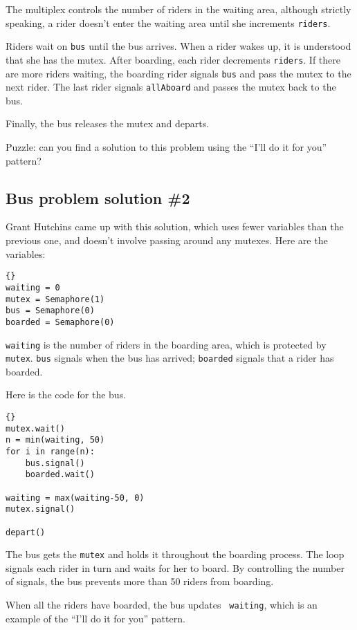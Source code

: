 \documentclass{book}
\newcommand{\clearemptydoublepage}{\newpage\cleardoublepage}
\begin{document}
The multiplex controls the number of riders in the waiting area,
although strictly speaking, a rider doesn't enter the waiting
area until she increments {\tt riders}.

Riders wait on {\tt bus} until the bus arrives.  When a rider
wakes up, it is understood that she has the mutex.
After boarding, each rider decrements {\tt riders}.  If there
are more riders waiting, the boarding rider signals {\tt bus}
and pass the mutex to the next rider.  The last rider signals
{\tt allAboard} and passes the mutex back to the bus.

Finally, the bus releases the mutex and departs.

Puzzle: can you find a solution to this problem using the
``I'll do it for you'' pattern?


\clearemptydoublepage
\subsection {Bus problem solution \#2}

Grant Hutchins came up with this solution, which uses fewer
variables than the previous one, and doesn't involve passing
around any mutexes.  Here are the variables:

\begin{lstlisting}[title={Bus problem solution \#2 (initialization)}]{}
waiting = 0
mutex = Semaphore(1)
bus = Semaphore(0)
boarded = Semaphore(0)
\end{lstlisting}

{\tt waiting} is the number of riders in the boarding area,
which is protected by {\tt mutex}.  {\tt bus} signals when the
bus has arrived; {\tt boarded} signals that a rider has boarded.

Here is the code for the bus.

\begin{lstlisting}[title={Bus problem solution (bus)}]{}
mutex.wait()
n = min(waiting, 50)
for i in range(n):
    bus.signal()
    boarded.wait()

waiting = max(waiting-50, 0)
mutex.signal()

depart()
\end{lstlisting}

The bus gets the {\tt mutex} and holds it throughout the boarding
process.  The loop signals each rider in turn and waits for her to
board.  By controlling the number of signals, the bus prevents
more than 50 riders from boarding.

When all the riders have boarded, the bus updates {\tt
waiting}, which is an example of the ``I'll do it for you'' pattern.
\end{document}
